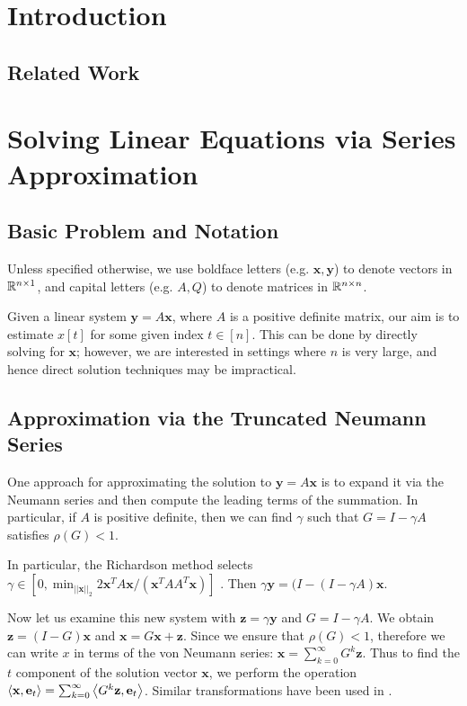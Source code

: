\section{Introduction}


\subsection{Related Work}


\section{Solving Linear Equations via Series Approximation}

\subsection{Basic Problem and Notation}

Unless specified otherwise, we use boldface letters (e.g. $\mathbf{x},\mathbf{y}$) to denote vectors in $\mathbb{R}^{n\times 1}$, and capital letters (e.g. $A,Q$) to denote matrices in $\mathbb{R}^{n\times n}$.


Given a linear system $\mathbf{y} = A\mathbf{x}$, where $A$ is a positive definite matrix, our aim is to estimate $x[t]$ for some given index $t\in[n]$. 
This can be done by directly solving for $\mathbf{x}$; however, we are interested in settings where $n$ is very large, and hence direct solution techniques may be impractical. 


\subsection{Approximation via the Truncated Neumann Series}

One approach for approximating the solution to $\mathbf{y} = A\mathbf{x}$ is to expand it via the Neumann series and then compute the leading terms of the summation.
In particular, if $A$ is positive definite, then we can find $\gamma$ such that $G = I - \gamma A$ satisfies $\rho(G) < 1$. 

In particular, the Richardson method selects $\gamma \in [0, \min_{||\mathbf{x}||_2} 2\mathbf{x}^TA\mathbf{x}/(\mathbf{x}^TAA^T\mathbf{x})]$ \cite{lee2014asynchronous}.
Then $\gamma\mathbf{y} = (I - (I - \gamma A)\mathbf{x}$.

Now let us examine this new system with $\mathbf{z} = \gamma \mathbf{y}$ and $G = I - \gamma A$. 
We obtain $\mathbf{z} = (I - G)\mathbf{x}$ and $\mathbf{x} = G\mathbf{x} + \mathbf{z}$. 
Since we ensure that $\rho(G)<1$, therefore we can write $x$ in terms of the von Neumann series: $\mathbf{x} = \sum_{k=0}^\infty G^k \mathbf{z}$. 
Thus to find the $t$ component of the solution vector $\mathbf{x}$, we perform the operation $\left< \mathbf{x}, \mathbf{e}_t \right> = \sum_{k=0}^\infty \left< G^k \mathbf{z}, \mathbf{e}_t \right>$. 
Similar transformations have been used in \cite{dimov2015new, lee2014asynchronous, wu2016multi}.

